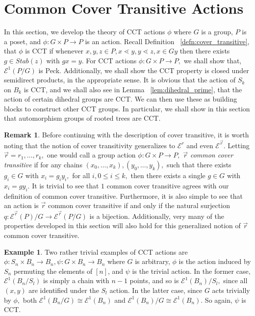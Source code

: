 \documentclass[10 pt]{amsart}
\theoremstyle{plain}
\theoremstyle{definition}
\newtheorem{rem}[thm]{Remark}
\newtheorem{eg}[thm]{Example}
\theoremstyle{remark}
\numberwithin{equation}{section}
\renewcommand{\vec}[1]{\overrightarrow{#1}}
\begin{document}
\section{Common Cover Transitive Actions}
\label{sec:cover_transitive}
In this section, we develop the theory of CCT actions $\phi$ where $G$ is a group, $P$ is a poset, and $\phi:G\times P \rightarrow P$ is an action. Recall Definition ~\ref{defn:cover_transitive}, that $\phi$ is CCT if whenever $x,y,z \in P,x\lessdot y,y\lessdot z,x \in Gy$ then there exists $g \in Stab(z)$ with $gx = y.$ For CCT actions $\phi:G\times P \rightarrow P,$ we shall show that, $\mathcal E^1(P/G)$ is Peck. Additionally, we shall show the CCT property is closed under semidirect products, in the appropriate sense. It is obvious that the action of $S_k$ on $B_k$ is CCT, and we shall also see in Lemma ~\ref{lem:dihedral_prime}, that the action of certain dihedral groups are CCT. We can then use these as building blocks to construct other CCT groups. In particular, we shall show in this section that automorphism groups of rooted trees are CCT.

\begin{rem}
Before continuing with the description of cover transitive, it is worth noting that the notion of cover transitivity generalizes to $\mathcal E^r$ and even $\mathcal E^{\vec r}.$ Letting $\vec r = r_1,\ldots, r_k,$ one would call a group action $\phi:G\times P \rightarrow P,$ {\it $\vec r$ common cover transitive} if for any chains $(x_0,\ldots, x_k),(y_0,\ldots, y_k),$ such that there exists $g_i \in G$ with $x_i = g_i y_i,$ for all $i,0\leq i \leq k,$ then there exists a single $g \in G$ with $x_i = g y_i.$ It is trivial to see that $1$ common cover transitive agrees with our definition of common cover transitive. Furthermore, it is also simple to see that an action is $\vec r$ common cover transitive if and only if the natural surjection $q:\mathcal E^{\vec r}(P)/G \rightarrow \mathcal E^{\vec r}(P/G)$ is a bijection. Additionally, very many of the properties developed in this section will also hold for this generalized notion of $\vec r$ common cover transitive.
\end{rem}

\begin{eg}
\label{eg:trivial_edgequot}
Two rather trivial examples of CCT actions are $\phi:S_n\times B_n \rightarrow B_n,\psi:G\times B_n\rightarrow B_n$ where $G$ is arbitrary, $\phi$ is the action induced by $S_n$ permuting the elements of $[n]$, and $\psi$ is the trivial action. In the former case, $\mathcal E^1(B_n/S_l)$ is simply a chain with $n-1$ points, and so is $\mathcal E^1(B_n)/S_l,$ since all $(x, y)$ are identified under the $S_l$ action. In the latter case, since $G$ acts trivially by $\phi,$ both  $\mathcal E^1(B_n/G) \cong \mathcal E^1(B_n)$ and $\mathcal E^1(B_n)/G \cong \mathcal E^1(B_n).$ So again, $\psi$ is CCT.
\end{eg}
\end{document}
